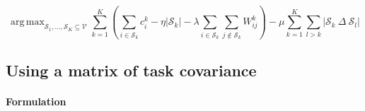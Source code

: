 \documentclass[12pt,a4paper]{article}
\newcommand{\sset}{\mathcal{S}}
\newcommand{\vset}{\mathcal{V}}
\DeclareMathOperator*{\argmax}{arg\,max}
\begin{document}


\begin{equation}
\argmax_{\sset_1, \dots, \sset_K \subseteq \vset }  \sum_{k=1}^K \left (
\sum_{i \in \sset_k} c_i^k - \eta |\sset_k| - 
\lambda \sum_{i \in \sset_k} \sum_{j \notin \sset_k} W_{ij}^k \right ) - 
\mu  \sum_{k=1}^K \sum_{l > k} |\sset_{k} ~\Delta~ \sset_{l}|
\label{eq:multi_scones}
\end{equation}


\subsection{Using a matrix of task covariance}

\paragraph{Formulation}
\end{document}

